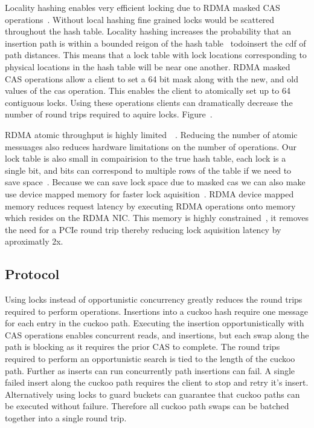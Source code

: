 Locality hashing enables very efficient locking due to RDMA
masked CAS operations~. Without
local hashing fine grained locks would be scattered
throughout the hash table. Locality hashing increases the
probability that an insertion path is within a bounded
reigon of the hash table ~todo{insert the cdf of path
distances}. This means that a lock table with lock locations
corresponding to physical locations in the hash table will
be near one another.  RDMA masked CAS operations allow a
client to set a 64 bit mask along with the new, and old
values of the cas operation. This enables the client to
atomically set up to 64 contiguous locks. Using these
operations clients can dramatically decrease the number of
round trips required to aquire locks. Figure~.

RDMA atomic throughput is highly
limited~\cite{design-guidelines}~\todo{[swordbox]}. Reducing
the number of atomic messuages also reduces hardware
limitations on the number of operations. Our lock table is
also small in compairision to the true hash table, each lock
is a single bit, and bits can correspond to multiple rows of
the table if we need to save space~. Because we can save lock space due to
masked cas we can also make use device mapped memory for
faster lock aquisition~\cite{sherman}. RDMA device mapped
memory reduces request latency by executing RDMA operations
onto memory which resides on the RDMA NIC. This memory is
highly constrained~, it removes the need
for a PCIe round trip thereby reducing lock aquisition
latency by aproximatly 2x.


\subsection{Protocol}

Using locks instead of opportunistic concurrency greatly
reduces the round trips required to perform operations.
Insertions into a cuckoo hash require one message for each
entry in the cuckoo path. Executing the insertion
opportunistically with CAS operations enables concurrent
reads, and insertions, but each swap along the path is
blocking as it requires the prior CAS to complete. The round
trips required to perform an opportunistic search is tied to
the length of the cuckoo path. Further as inserts can run
concurrently path insertions can fail. A single failed
insert along the cuckoo path requires the client to stop and
retry it's insert. Alternatively using locks to guard
buckets can guarantee that cuckoo paths can be executed
without failure. Therefore all cuckoo path swaps can be
batched together into a single round trip.

